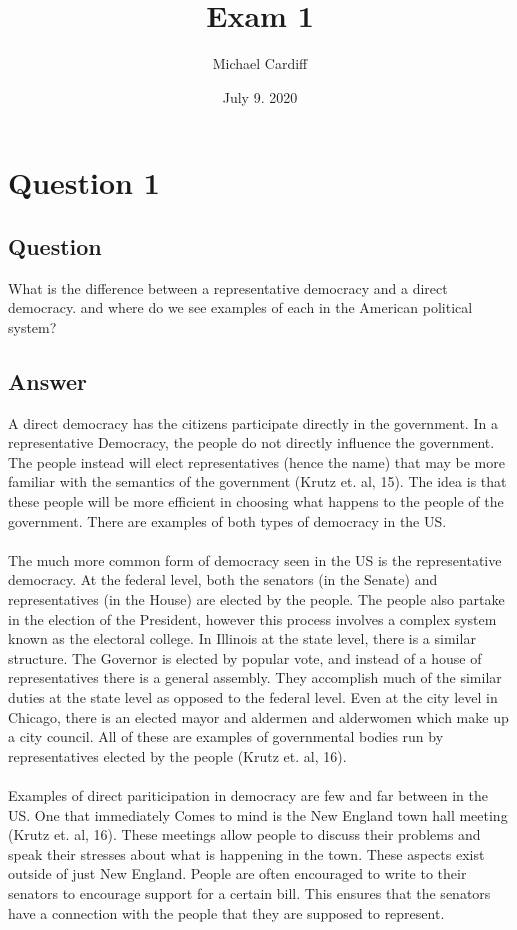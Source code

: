 \documentclass[12pt]{article}
\title{Exam 1}
\author{Michael Cardiff}
\date{July 9. 2020}
\begin{document}
\maketitle
\section*{Question 1}
\subsection*{Question}
What is the difference between a representative democracy and a direct democracy. and
where do we see examples of each in the American political system?
\subsection*{Answer}
\indent A direct democracy has the citizens participate directly in the government. In a
representative Democracy, the people do not directly influence the government. The people
instead will elect representatives (hence the name) that may be more familiar with the
semantics of the government (Krutz et. al, 15). The idea is that these people will be more
efficient in choosing what happens to the people of the government. There are examples of
both types of democracy in the US.
\paragraph{}
\indent The much more common form of democracy seen in the US is the representative
democracy. At the federal level, both the senators (in the Senate) and representatives (in
the House) are elected by the people. The people also partake in the election of the
President, however this process involves a complex system known as the electoral
college. In Illinois at the state level, there is a similar structure. The Governor is
elected by popular vote, and instead of a house of representatives there is a general
assembly. They accomplish much of the similar duties at the state level as opposed to the
federal level. Even at the city level in Chicago, there is an elected mayor and aldermen
and alderwomen which make up a city council. All of these are examples of governmental
bodies run by representatives elected by the people (Krutz et. al, 16).
\paragraph{}
\indent Examples of direct pariticipation in democracy are few and far between in the
US. One that immediately Comes to mind is the New England town hall meeting (Krutz et. al,
16). These meetings allow people to discuss their problems and speak their stresses about
what is happening in the town. These aspects exist outside of just New England. People are
often encouraged to write to their senators to encourage support for a certain bill. This
ensures that the senators have a connection with the people that they are supposed to
represent. 
\newpage
\end{document}
